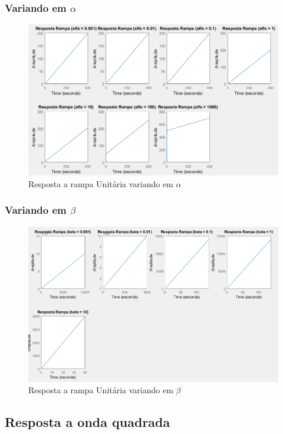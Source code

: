 \documentclass[a4paper, 12pt]{article}
\begin{document}
		\subsubsection{Variando em $\alpha$}
		\begin{figure}[!ht]
			\centering
			\includegraphics[scale=0.5]{img/3e_alfa.png}
			\caption{Resposta a rampa Unitária variando em $\alpha$}
		\end{figure}
		\subsubsection{Variando em $\beta$}
		\begin{figure}[!ht]
			\centering
			\includegraphics[scale=0.45]{img/3e_beta.png}
			\caption{Resposta a rampa Unitária variando em $\beta$}
		\end{figure}
		\subsection{Resposta a onda quadrada}
\end{document}
